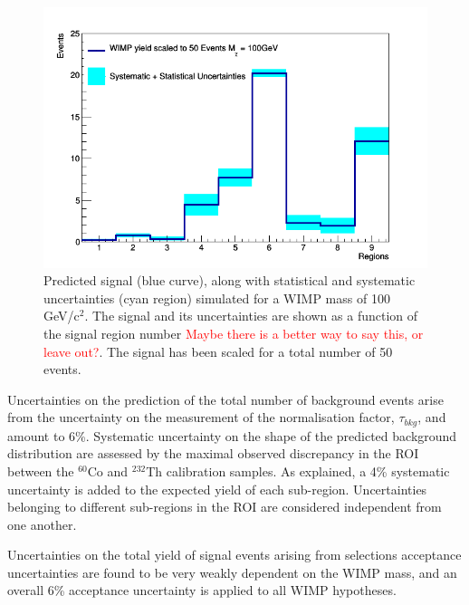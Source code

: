 {%
\begin{figure}[t!]
  \includegraphics[width=\linewidth]{images/wimp_sys_unc.png}
  \caption{Predicted signal (blue curve), along with statistical and systematic uncertainties (cyan region) simulated for a WIMP mass of 100\,GeV/c$^2$. The signal and its uncertainties are shown as a function of the signal region number {\textcolor{red} {Maybe there is a better way to say this, or leave out?}}. The signal has been scaled for a total number of 50 events. }
  \label{fig:unc}
\end{figure}


Uncertainties on the  prediction of the total number of background events arise from the uncertainty on the measurement of the normalisation 
factor, $\tau_{bkg}$, and amount to 6\%. %
Systematic uncertainty on the shape of the predicted background distribution are assessed by the maximal observed discrepancy in the ROI between
the $^{60}$Co and $^{232}$Th calibration samples.  As explained, a 4\% systematic uncertainty is added  to the expected yield of each sub-region.
Uncertainties belonging to different sub-regions in the ROI are considered independent from one another.

Uncertainties on the total yield of signal events arising from selections acceptance uncertainties are found to be very weakly dependent on 
the WIMP mass, and an overall 6\% acceptance uncertainty is applied to all WIMP hypotheses. 

}
